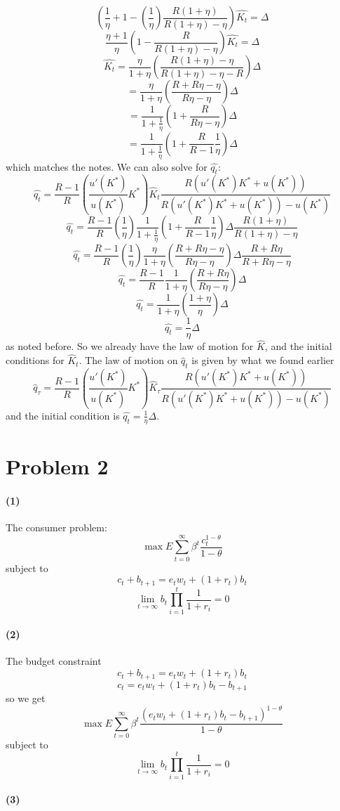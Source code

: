\documentclass[10pt,letter]{article}
\newcommand{\problem}[1]{\section*{Problem #1}}
\newcommand{\problempart}[1]{\paragraph{#1}}
\begin{document}
\[ \left( \frac{1}{\eta} + 1 -  \left(\frac{1}{\eta} \right) \frac{R(1 + \eta)}{R(1 + \eta)-\eta }\right) \hat{K_t}  = \Delta \]
\[ \frac{\eta + 1}{\eta}\left( 1 -  \frac{R}{R(1 + \eta)-\eta }\right) \hat{K_t}  = \Delta \]
\[ \hat{K_t}  = \frac{\eta}{1 + \eta}\left( \frac{R(1 + \eta)-\eta }{R(1 + \eta)-\eta  - R}\right)\Delta \]
\[  = \frac{\eta}{1 + \eta}\left( \frac{R + R\eta-\eta }{R \eta -\eta }\right)\Delta \]
\[  = \frac{1}{1 + \frac{1}{\eta}}\left( 1 + \frac{R}{R \eta -\eta }\right)\Delta \]
\[  = \frac{1}{1 + \frac{1}{\eta}}\left( 1 + \frac{R}{R - 1 }\frac{1}{\eta}\right)\Delta \]
which matches the notes. We can also solve for $\hat{q_t}$:
\[\hat{q_t}= \frac{R-1}{R}\left(\frac{u'(K^*)}{u(K^*)}K^* \right)\hat{K}_{t} \frac{R(u'(K^*)K^* + u(K^*))}{R(u'(K^*)K^* + u(K^*))-u(K^*) }  \]
\[\hat{q_t}= \frac{R-1}{R}\left(\frac{1}{\eta} \right)\frac{1}{1 + \frac{1}{\eta}}\left( 1 + \frac{R}{R - 1 }\frac{1}{\eta}\right)\Delta  \frac{R(1 + \eta)}{R(1 + \eta)-\eta }  \]
\[\hat{q_t}= \frac{R-1}{R}\left(\frac{1}{\eta} \right)\frac{\eta}{1 + \eta}\left( \frac{R + R\eta - \eta}{R\eta - \eta }\right)\Delta  \frac{R + R\eta}{R + R\eta-\eta }  \]
\[\hat{q_t}= \frac{R-1}{R}\frac{1}{1 + \eta}\left( \frac{R + R\eta}{R\eta - \eta }\right)\Delta   \]
\[\hat{q_t}= \frac{1}{1 + \eta}\left( \frac{1 + \eta}{\eta}\right)\Delta   \]
\[\hat{q_t}= \frac{1}{\eta}\Delta   \]
as noted before. So we already have the law of motion for $\hat{K}$, and the initial conditions for $\hat{K}_t$. The law of motion on $\hat{q}_t$ is given by what we found earlier
\[ \hat{q}_\tau = \frac{R-1}{R}\left(\frac{u'(K^*)}{u(K^*)}K^* \right)\hat{K}_{\tau} \frac{R(u'(K^*)K^* + u(K^*))}{R(u'(K^*)K^* + u(K^*))-u(K^*) }  \]
and the initial condition is $\hat{q_t}= \frac{1}{\eta}\Delta $.

\problem{2}
\problempart{(1)}
The consumer problem:
\[ \max E \sum_{t=0}^\infty \beta^t \frac{c_t^{1-\theta}}{1-\theta} \]
subject to
\[ c_t + b_{t+1} = e_t w_t + (1+r_t)b_t \]
\[ \lim_{t\to \infty} b_t \prod_{i=1}^t \frac{1}{1+r_i} = 0 \]
\problempart{(2)}
The budget constraint
\[ c_t + b_{t+1} = e_t w_t + (1+r_t)b_t \]
\[ c_t = e_t w_t + (1+r_t)b_t - b_{t+1} \]
so we get
\[ \max E \sum_{t=0}^\infty \beta^t \frac{(e_t w_t + (1+r_t)b_t - b_{t+1})^{1-\theta}}{1-\theta} \]
subject to
\[ \lim_{t\to \infty} b_t \prod_{i=1}^t \frac{1}{1+r_i} = 0 \]
\problempart{(3)}
\end{document}
